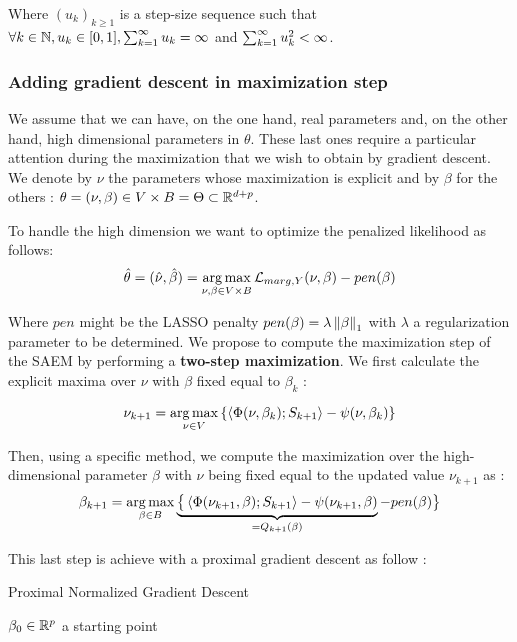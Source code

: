 \documentclass[a4paper]{article}
\renewcommand{\varobs}{Y}
\begin{document}
\begin{myAppendix}
            Where $(u_k)_{k\geq 1}$ is a step-size sequence such that $\forall k \in \mathbb N, u_k \in [0,1], \sum_{k=1} ^{\infty} u_k= \infty$ and $\sum_{k=1} ^{\infty} u_k^2< \infty$.
            
            

        \subsubsection{Adding gradient descent in maximization step}

We assume that we can have, on the one hand, real parameters and, on the other hand, high dimensional parameters in $\theta$. These last ones require a particular attention during the maximization that we wish to obtain by gradient descent. We denote by $\nu$ the parameters whose maximization is explicit and by $\beta$ for the others : $\theta = (\nu, \beta)\in V \times B = \Theta \subset\mathbb R^{d+p}$.


To handle the high dimension we want to optimize the penalized likelihood as follows: 
    $$\hat \theta = (\hat\nu, \hat\beta) = \argmax_{\nu, \beta \in V \times B}\Lmarg[,\varobs] (\nu,\beta) - pen(\beta)$$

Where $pen$ might be the LASSO penalty $pen(\beta) = \lambda \left\|\beta\right\|_1$ with $\lambda$ a regularization parameter to be determined. We propose to compute the maximization step of the SAEM by performing a \textbf{two-step maximization}. We first calculate the explicit maxima over $\nu$ with $\beta$ fixed equal to $\beta_k$ :

    $$\nu_{k+1} = \operatorname*{arg\,max}_{\nu\in V}\left\{\left\langle \Phi(\nu,\beta_k) ; S_{k+1}\right\rangle - \psi(\nu, \beta_k) \right\}$$ 

Then, using a specific method, we compute the maximization over the high-dimensional parameter $\beta$ with $\nu$ being fixed equal to the updated value $\nu_{k+1}$ as : 
    $$\beta_{k+1} = \operatorname*{arg\,max}_{\beta\in B}\underbrace{\big\{\left\langle \Phi(\nu_{k+1},\beta) ; S_{k+1}\right\rangle - \psi(\nu_{k+1}, \beta)}_{=Q_{k+1}(\beta)} - pen(\beta)\big\}$$

This last step is achieve with a proximal gradient descent as follow : 

\begin{myAlgorithm}[12cm]
    \caption{Proximal Normalized Gradient Descent}\label{PNGD}
    \Initialize $\beta_0 \in \mathbb R^p$ a starting point
    
\end{myAlgorithm}
\end{myAppendix}
\end{document}
